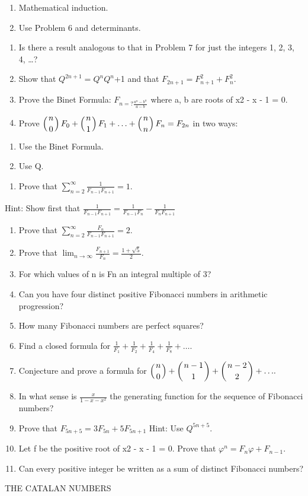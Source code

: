 \documentclass{article}
\begin{document}
\begin{enumerate}
\item Mathematical induction.
\item Use Problem 6 and determinants.
\end{enumerate}
\begin{enumerate}
\item Is there a result analogous to that in Problem 7 for just the integers 1, 2, 3, 4, …?
\item Show that  $Q^{2n+1}=Q^nQ^n$+1  and that  $F_{2n+1}=F_{n+1}^2+F_n^2$.
\item Prove the Binet Formula:  $F_{n=?\frac{a^n-b^n}{a-b}}$ where a, b are roots of x2 - x - 1 = 0.
\item Prove 
$\left(\genfrac{}{}{0pt}{0}n0\right)F_0+\left(\genfrac{}{}{0pt}{0}n1\right)F_1+{\dots}+\left(\genfrac{}{}{0pt}{0}nn\right)F_n=F_{2n}$
in two ways:
\end{enumerate}
\begin{enumerate}
\item Use the Binet Formula.
\item Use Q.
\end{enumerate}
\begin{enumerate}
\item Prove that  $\sum _{n=2}^{{\infty}}\frac 1{F_{n-1}F_{n+1}}=1.$
\end{enumerate}
 Hint: Show first that   $\frac 1{F_{n-1}F_{n+1}}=\frac 1{F_{n-1}F_n}-\frac 1{F_nF_{n+1}}$

\begin{enumerate}
\item Prove that  $\sum _{n=2}^{{\infty}}\frac{F_n}{F_{n-1}F_{n+1}}=2.$
\item Prove that  $\lim _{n\rightarrow {\infty}}\frac{F_{n+1}}{F_n}=\frac{1+\sqrt 5} 2.$
\item For which values of n is Fn an integral multiple of 3?
\item Can you have four distinct positive Fibonacci numbers in arithmetic progression?
\item How many Fibonacci numbers are perfect squares?
\item Find a closed formula for  $\frac 1{F_1}+\frac 1{F_2}+\frac 1{F_4}+\frac 1{F_8}+{\dots}.$
\item Conjecture and prove a formula for 
$\left(\genfrac{}{}{0pt}{0}n0\right)+\left(\genfrac{}{}{0pt}{0}{n-1}1\right)+\left(\genfrac{}{}{0pt}{0}{n-2}2\right)+{\dots}.$
\item In what sense is  $\frac x{1-x-x^2}$ the generating function for the sequence of Fibonacci numbers?
\item Prove that  $F_{5n+5}=3F_{5n}+5F_{5n+1}$  Hint: Use  $Q^{5n+5}$.
\item Let \textgreek{f }be the positive root of x2 - x - 1 = 0. Prove that  $\varphi ^n=F_n\varphi +F_{n-1}$.
\item Can every positive integer be written as a sum of distinct Fibonacci numbers?
\end{enumerate}
THE CATALAN NUMBERS
\end{document}
